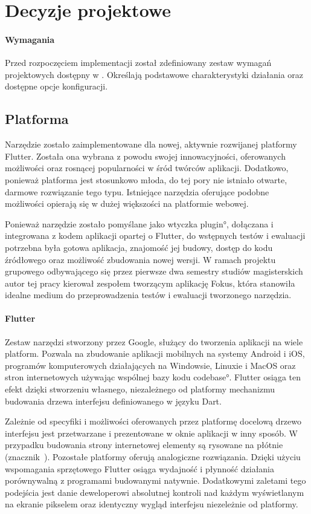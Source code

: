 \section{Decyzje projektowe}

\paragraph{Wymagania} Przed rozpoczęciem implementacji został zdefiniowany zestaw wymagań projektowych dostępny w . Określają podstawowe charakterystyki działania oraz dostępne opcje konfiguracji.

\subsection{Platforma}
Narzędzie zostało zaimplementowane dla nowej, aktywnie rozwijanej platformy Flutter. Została ona wybrana z powodu swojej innowacyjności, oferowanych możliwości oraz rosnącej popularności w śród twórców aplikacji. Dodatkowo, ponieważ platforma jest stosunkowo młoda, do tej pory nie istniało otwarte, darmowe rozwiązanie tego typu. Istniejące narzędzia oferujące podobne możliwości opierają się w dużej większości na platformie webowej.

Ponieważ narzędzie zostało pomyślane jako wtyczka \ang{plugin}, dołączana i integrowana z kodem aplikacji opartej o Flutter, do wstępnych testów i ewaluacji potrzebna była gotowa aplikacja, znajomość jej budowy, dostęp do kodu źródłowego oraz możliwość zbudowania nowej wersji. W ramach projektu grupowego odbywającego się przez pierwsze dwa semestry studiów magisterskich autor tej pracy kierował zespołem tworzącym aplikację Fokus, która stanowiła idealne medium do przeprowadzenia testów i ewaluacji tworzonego narzędzia.

\paragraph{Flutter} Zestaw narzędzi stworzony przez Google, służący do tworzenia aplikacji na wiele platform. Pozwala na zbudowanie aplikacji mobilnych na systemy Android i iOS, programów komputerowych działających na Windowsie, Linuxie i MacOS oraz stron internetowych używając wspólnej bazy kodu \ang{codebase}. Flutter osiąga ten efekt dzięki stworzeniu własnego, niezależnego od platformy mechanizmu budowania drzewa interfejsu definiowanego w języku Dart. 

Zależnie od specyfiki i możliwości oferowanych przez platformę docelową drzewo interfejsu jest przetwarzane i prezentowane w oknie aplikacji w inny sposób. W przypadku budowania strony internetowej elementy są rysowane na płótnie (znacznik~). Pozostałe platformy oferują analogiczne rozwiązania. Dzięki użyciu wspomagania sprzętowego Flutter osiąga wydajność i płynność działania porównywalną z programami budowanymi natywnie. Dodatkowymi zaletami tego podejścia jest danie deweloperowi absolutnej kontroli nad każdym wyświetlanym na ekranie pikselem oraz identyczny wygląd interfejsu niezeleżnie od platformy.

